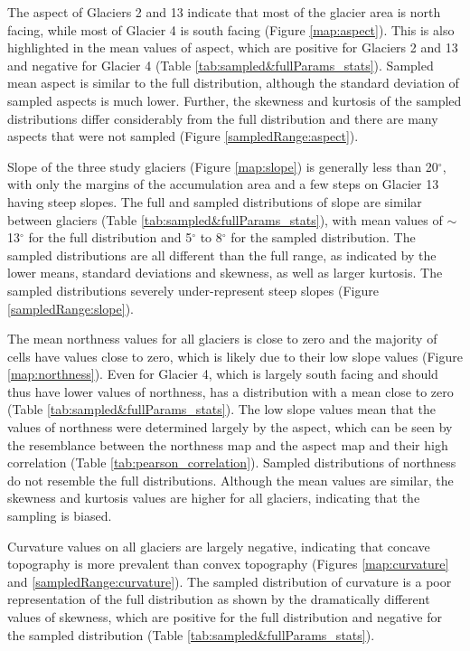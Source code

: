 \documentclass{sfuthesis}
\begin{document}
The aspect of Glaciers 2 and 13 indicate that most of the glacier area is north facing, while most of Glacier 4 is south facing (Figure \ref{map:aspect}). This is also highlighted in the mean values of aspect, which are positive for Glaciers 2 and 13 and negative for Glacier 4 (Table \ref{tab:sampled&fullParams_stats}). Sampled mean aspect is similar to the full distribution, although the standard deviation of sampled aspects is much lower. Further, the skewness and kurtosis of the sampled distributions differ considerably from the full distribution and there are many aspects that were not sampled (Figure \ref{sampledRange:aspect}). 

Slope of the three study glaciers (Figure \ref{map:slope}) is generally less than 20$^{\circ}$, with only the margins of the accumulation area and a few steps on Glacier 13 having steep slopes. The full and sampled distributions of slope are similar between glaciers (Table \ref{tab:sampled&fullParams_stats}), with mean values of $\sim$13$^{\circ}$ for the full distribution and 5$^{\circ}$ to 8$^{\circ}$ for the sampled distribution. The sampled distributions are all different than the full range, as indicated by the lower means, standard deviations and skewness, as well as larger kurtosis. The sampled distributions severely under-represent steep slopes (Figure \ref{sampledRange:slope}).

The mean northness values for all glaciers is close to zero and the majority of cells have values close to zero, which is likely due to their low slope values (Figure \ref{map:northness}). Even for Glacier 4, which is largely south facing and should thus have lower values of northness, has a distribution with a mean close to zero (Table \ref{tab:sampled&fullParams_stats}). The low slope values mean that the values of northness were determined largely by the aspect, which can be seen by the resemblance between the northness map and the aspect map and their high correlation (Table \ref{tab:pearson_correlation}). Sampled distributions of northness do not resemble the full distributions. Although the mean values are similar, the skewness and kurtosis values are higher for all glaciers, indicating that the sampling is biased.

Curvature values on all glaciers are largely negative, indicating that concave topography is more prevalent than convex topography (Figures \ref{map:curvature} and \ref{sampledRange:curvature}). The sampled distribution of curvature is a poor representation of the full distribution as shown by the dramatically different values of skewness, which are positive for the full distribution and negative for the sampled distribution (Table \ref{tab:sampled&fullParams_stats}). 
\end{document}
